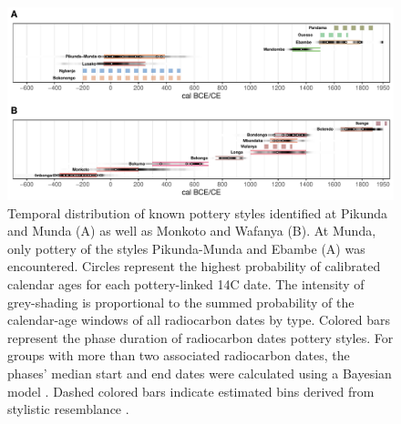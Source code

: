 \documentclass[preprint,10pt,oneside,onecolumn,authoryear]{elsarticle}
\begin{document}
\begin{figure}[!tb]
	\centering
	\includegraphics[width=.9\textwidth]{Fig_PotteryChrono.pdf}
	\caption{Temporal distribution of known pottery styles identified at Pikunda and Munda (A) as well as Monkoto and Wafanya (B). At Munda, only pottery of the styles Pikunda-Munda and Ebambe (A) was encountered. Circles represent the highest probability of calibrated calendar ages for each pottery-linked 14C date. The intensity of grey-shading is proportional to the summed probability of the calendar-age windows of all radiocarbon dates by type. Colored bars represent the phase duration of radiocarbon dates pottery styles. For groups with more than two associated radiocarbon dates, the phases’ median start and end dates were calculated using a Bayesian model \citep[Fig.~S1, Tab.~S1]{Crema.2021a,Crema.2021b,Seidensticker.2024}. Dashed colored bars indicate estimated bins derived from stylistic resemblance \citep[218--244 Fig.~100--107]{Seidensticker.2021,Seidensticker.2021e}.}
	\label{fig:chrono}
\end{figure}
\end{document}

